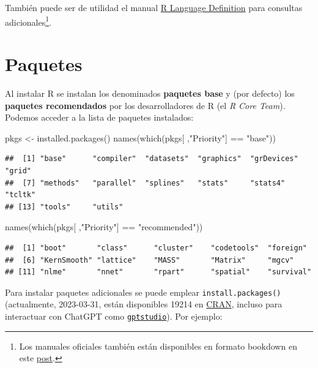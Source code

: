 \documentclass[
]{book}
\newenvironment{Shaded}{\begin{snugshade}}{\end{snugshade}}
\newcommand{\FunctionTok}[1]{\textcolor[rgb]{0.00,0.00,0.00}{#1}}
\newcommand{\NormalTok}[1]{#1}
\newcommand{\OtherTok}[1]{\textcolor[rgb]{0.56,0.35,0.01}{#1}}
\newcommand{\SpecialCharTok}[1]{\textcolor[rgb]{0.00,0.00,0.00}{#1}}
\newcommand{\StringTok}[1]{\textcolor[rgb]{0.31,0.60,0.02}{#1}}
\theoremstyle{break}
\theoremstyle{nonumberplain}
\begin{document}
También puede ser de utilidad el manual \href{https://cran.r-project.org/doc/manuals/R-lang.html}{R Language Definition}
para consultas adicionales\footnote{Los manuales oficiales también están disponibles en formato bookdown en este \href{https://colinfay.me/r-manuals}{post}.}.

\hypertarget{paquetes}{%
\section{Paquetes}\label{paquetes}}

Al instalar R se instalan los denominados \textbf{paquetes base} y (por defecto) los \textbf{paquetes recomendados} por los desarrolladores de R (el \emph{R Core Team}).
Podemos acceder a la lista de paquetes instalados:

\begin{Shaded}
\begin{Highlighting}[]
\NormalTok{pkgs }\OtherTok{\textless{}{-}} \FunctionTok{installed.packages}\NormalTok{()}
\FunctionTok{names}\NormalTok{(}\FunctionTok{which}\NormalTok{(pkgs[ ,}\StringTok{"Priority"}\NormalTok{] }\SpecialCharTok{==} \StringTok{"base"}\NormalTok{))}
\end{Highlighting}
\end{Shaded}

\begin{verbatim}
##  [1] "base"      "compiler"  "datasets"  "graphics"  "grDevices" "grid"     
##  [7] "methods"   "parallel"  "splines"   "stats"     "stats4"    "tcltk"    
## [13] "tools"     "utils"
\end{verbatim}

\begin{Shaded}
\begin{Highlighting}[]
\FunctionTok{names}\NormalTok{(}\FunctionTok{which}\NormalTok{(pkgs[ ,}\StringTok{"Priority"}\NormalTok{] }\SpecialCharTok{==} \StringTok{"recommended"}\NormalTok{))}
\end{Highlighting}
\end{Shaded}

\begin{verbatim}
##  [1] "boot"       "class"      "cluster"    "codetools"  "foreign"   
##  [6] "KernSmooth" "lattice"    "MASS"       "Matrix"     "mgcv"      
## [11] "nlme"       "nnet"       "rpart"      "spatial"    "survival"
\end{verbatim}

Para instalar paquetes adicionales se puede emplear \texttt{install.packages()} (actualmente, 2023-03-31, están disponibles 19214 en \href{https://cran.r-project.org/web/packages/available_packages_by_date.html}{CRAN}, incluso para interactuar con ChatGPT como \href{https://michelnivard.github.io/gptstudio}{\texttt{gptstudio}}).
Por ejemplo:
\end{document}
